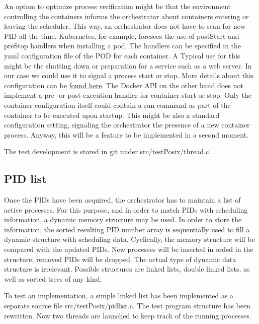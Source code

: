 \documentclass[]{scrartcl}
\begin{document}
An option to optimize process verification might be that the environment controlling the containers informs the orchestrator about containers entering or leaving the scheduler.
This way, an orchestrator does not have to scan for new PID all the time.
Kubernetes, for example, foresees the use of postStart and preStop handlers when installing a pod. 
The handlers can be specified in the yaml configuration file of the POD for each container. A Typical use for this might be the shutting down or preparation for a service such as a web server. 
In our case we could use it to signal a process start or stop.
More details about this configuration can be \href{{https://kubernetes.io/docs/tasks/configure-pod-container/attach-handler-lifecycle-event/}}{found here}.
The Docker API on the other hand does not implement a pre- or post execution handler for container start or stop. 
Only the container configuration itself could contain a run command as part of the container to be executed upon startup. This might be also a standard configuration setting, signaling the orchestrator the presence of a new container process.
Anyway, this will be a feature to be implemented in a second moment.

The test development is stored in git under {src/testPosix/thread.c}.

\subsection{PID list}

Once the PIDs have been acquired, the orchestrator has to maintain a list of active processes. 
For this purpose, and in order to match PIDs with scheduling information, a dynamic memory structure may be used.
In order to store the information, the sorted resulting PID number array is sequentially used to fill a dynamic structure with scheduling data. 
Cyclically, the memory structure will be compared with the updated PIDs. New processes will be inserted in orded in the structure, removed PIDs will be dropped.
The actual type of dynamic data structure is irrelevant. Possible structures are linked lists, double linked lists, as well as sorted trees of any kind.

To test an implementation, a simple linked list has been implemented as a separate source file {src/testPosix/pidlist.c}.
The test program structure has been rewritten. Now two threads are launched to keep track of the running processes. 
\end{document}
